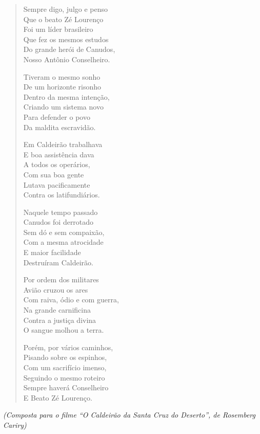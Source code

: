 \begin{verse}
Sempre digo, julgo e penso\\
Que o beato Zé Lourenço\\
Foi um líder brasileiro\\
Que fez os mesmos estudos\\
Do grande herói de Canudos,\\
Nosso Antônio Conselheiro.

Tiveram o mesmo sonho\\
De um horizonte risonho\\
Dentro da mesma intenção,\\
Criando um sistema novo\\
Para defender o povo\\
Da maldita escravidão.

Em Caldeirão trabalhava\\
E boa assistência dava\\
A todos os operários,\\
Com sua boa gente\\
Lutava pacificamente\\
Contra os latifundiários.

Naquele tempo passado\\
Canudos foi derrotado\\
Sem dó e sem compaixão,\\
Com a mesma atrocidade\\
E maior facilidade\\
Destruíram Caldeirão.

Por ordem dos militares\\
Avião cruzou os ares\\
Com raiva, ódio e com guerra,\\
Na grande carnificina\\
Contra a justiça divina\\
O sangue molhou a terra.

Porém, por vários caminhos,\\
Pisando sobre os espinhos,\\
Com um sacrifício imenso,\\
Seguindo o mesmo roteiro\\
Sempre haverá Conselheiro\\
E Beato Zé Lourenço.
\end{verse}

\begin{flushright}
\emph{(Composta para o filme ``O Caldeirão da Santa Cruz do Deserto'',
de Rosemberg Cariry)}
\end{flushright}

